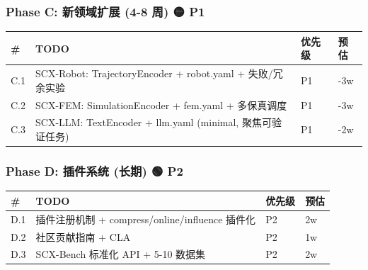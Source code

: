 \documentclass[
  12pt,
]{ctexart}
\begin{document}
\subsubsection{Phase C: 新领域扩展 (4-8 周) 🟡
P1}\label{phase-c-ux65b0ux9886ux57dfux6269ux5c55-4-8-ux5468-p1}

\begin{longtable}[]{@{}
  >{\raggedright\arraybackslash}p{}
  >{\raggedright\arraybackslash}p{}
  >{\raggedright\arraybackslash}p{}
  >{\raggedright\arraybackslash}p{}@{}}
\toprule\noalign{}
\begin{minipage}[b]{\linewidth}\raggedright
\#
\end{minipage} & \begin{minipage}[b]{\linewidth}\raggedright
TODO
\end{minipage} & \begin{minipage}[b]{\linewidth}\raggedright
优先级
\end{minipage} & \begin{minipage}[b]{\linewidth}\raggedright
预估
\end{minipage} \\
\midrule\noalign{}
\endhead
\bottomrule\noalign{}
\endlastfoot
C.1 & SCX-Robot: TrajectoryEncoder + robot.yaml + 失败/冗余实验 & P1 &
2-3w \\
C.2 & SCX-FEM: SimulationEncoder + fem.yaml + 多保真调度 & P1 & 2-3w \\
C.3 & SCX-LLM: TextEncoder + llm.yaml (minimal, 聚焦可验证任务) & P1 &
1-2w \\
\end{longtable}

\subsubsection{Phase D: 插件系统 (长期) 🟢
P2}\label{phase-d-ux63d2ux4ef6ux7cfbux7edf-ux957fux671f-p2}

\begin{longtable}[]{@{}llll@{}}
\toprule\noalign{}
\# & TODO & 优先级 & 预估 \\
\midrule\noalign{}
\endhead
\bottomrule\noalign{}
\endlastfoot
D.1 & 插件注册机制 + compress/online/influence 插件化 & P2 & 2w \\
D.2 & 社区贡献指南 + CLA & P2 & 1w \\
D.3 & SCX-Bench 标准化 API + 5-10 数据集 & P2 & 2w \\
\end{longtable}
\end{document}
